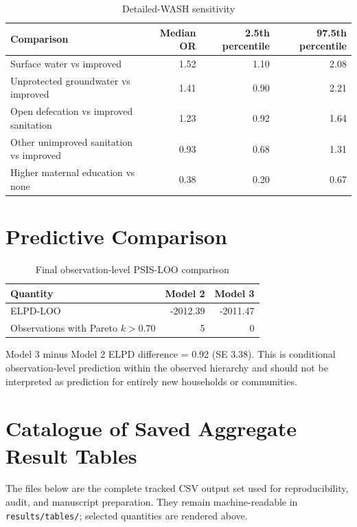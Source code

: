 \begin{table}[H]
\centering
\caption{Detailed-WASH sensitivity}
\begin{tabular}{lrrr}
\toprule
Comparison & Median OR & 2.5th percentile & 97.5th percentile \\
\midrule
Surface water vs improved & 1.52 & 1.10 & 2.08 \\
Unprotected groundwater vs improved & 1.41 & 0.90 & 2.21 \\
Open defecation vs improved sanitation & 1.23 & 0.92 & 1.64 \\
Other unimproved sanitation vs improved & 0.93 & 0.68 & 1.31 \\
Higher maternal education vs none & 0.38 & 0.20 & 0.67 \\
\bottomrule
\end{tabular}
\end{table}

\section{Predictive Comparison}

\begin{table}[H]
\centering
\caption{Final observation-level PSIS-LOO comparison}
\begin{tabular}{lrr}
\toprule
Quantity & Model 2 & Model 3 \\
\midrule
ELPD-LOO & -2012.39 & -2011.47 \\
Observations with Pareto $k>0.70$ & 5 & 0 \\
\bottomrule
\end{tabular}

\vspace{0.4em}
\begin{minipage}{0.92\textwidth}
\footnotesize
Model 3 minus Model 2 ELPD difference = 0.92 (SE 3.38). This is conditional observation-level prediction within the observed hierarchy and should not be interpreted as prediction for entirely new households or communities.
\end{minipage}
\end{table}

\section{Catalogue of Saved Aggregate Result Tables}

The files below are the complete tracked CSV output set used for reproducibility, audit, and manuscript preparation. They remain machine-readable in \texttt{results/tables/}; selected quantities are rendered above.

